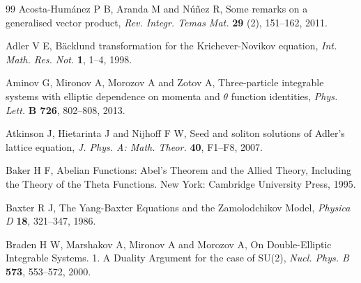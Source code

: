 \documentclass[fleqn,11pt,twoside]{article}
\theoremstyle{definition}
\begin{document}

%
%



\begin{thebibliography}{99}
Acosta-Hum\'anez P B, Aranda M and N\'u\~nez R, Some remarks on a generalised vector 
product, {\it Rev. Integr. Temas Mat.} {\bf 29} (2), 151--162, 2011.  

Adler V E, B\"acklund transformation for the Krichever-Novikov 
equation, {\it Int. Math. Res. Not.} {\bf 1}, 1--4, 1998.  


Aminov G, Mironov A, Morozov A and Zotov A, Three-particle integrable systems with elliptic dependence on momenta and $\theta$ 
function identities, {\it Phys. Lett.} {\bf B 726}, 802--808, 2013.   

Atkinson J, Hietarinta J and Nijhoff F W, Seed and soliton 
solutions of Adler's lattice equation, {\it J. Phys. A: Math. Theor.} 
{\bf 40}, F1--F8, 2007. 

Baker H F, Abelian Functions: Abel’s Theorem and the Allied Theory, Including the
Theory of the Theta Functions. New York: Cambridge University Press, 1995.

Baxter R J, The Yang-Baxter Equations and the Zamolodchikov Model, 
{\it Physica D} {\bf 18}, 321--347, 1986.


Braden H W, Marshakov A, Mironov A and Morozov A,  
On Double-Elliptic Integrable Systems. 1. A Duality Argument for the 
case of SU(2), {\it Nucl. Phys. B} {\bf 573}, 553--572, 2000.


\end{thebibliography}
\end{document}
